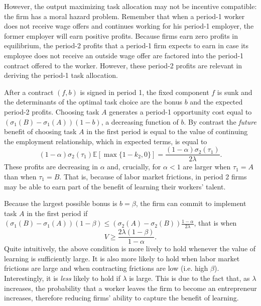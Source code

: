 \documentclass[12pt,american]{paper}
\theoremstyle{remark}
\begin{document}
However, the output maximizing task allocation may not be incentive compatible: the firm has a moral hazard problem. Remember that when a period-1 worker does not receive wage offers and continues working for his period-1 employer, the former employer will earn positive profits. Because firms earn zero profits in equilibrium, the period-2 profits that a period-1 firm expects to earn in case its employee does not receive an outside wage offer are factored into the period-1 contract offered to the  worker. However, these period-2 profits  are relevant in deriving the period-1 task allocation. 

After a contract $(f,b)$  is signed in period 1, the fixed component $f$ is sunk and the determinants of the optimal task choice are the bonus $b$ and the expected period-2 profits. Choosing task $A$ generates a period-1 opportunity cost equal to $( \sigma_1(B)- \sigma_1(A))(1-b)$, a decreasing function of $b$. By contrast the \textit{future} benefit of choosing task $A$ in the first period is equal to the value of continuing the employment relationship, which in expected terms, is equal to 
\[(1- \alpha) \sigma_2(\tau_1) \mathbb E[\max \{1-k_2,0\}]=\frac{(1-\alpha) \sigma_2(\tau_1)}{2\lambda}.\]
These profits are decreasing in $\alpha$ and, crucially, for $\alpha<1$ are larger when $\tau_1=A$ than when $\tau_1=B$. That is, because of labor market frictions, in period 2 firms may be able to earn part of the benefit of learning their workers' talent. 

Because the largest possible bonus  is $b=\beta$,  the firm can commit to implement task $A$ in the first period if $( \sigma_1(B)- \sigma_1(A))(1-\beta) \leq(\sigma_2(A)-\sigma_2(B))\frac{1-\alpha}{2\lambda} $, that is when
%
\begin{equation}\label{eq: commitment}
V \geq \frac{2 \lambda (1-\beta)}{1-\alpha}.
\end{equation}
Quite intuitively, the above condition is more lively to hold whenever the value of learning is sufficiently large. It is also more likely to hold when labor market frictions are large and when contracting frictions are low (i.e. high $\beta$). Interestingly, it is \textit{less} likely to hold if $\lambda$ is large. This is due to the fact that, as $\lambda$ increases, the probability that a worker leaves the firm to become an entrepreneur increases, therefore reducing  firms' ability to capture the benefit of learning.
\end{document}
